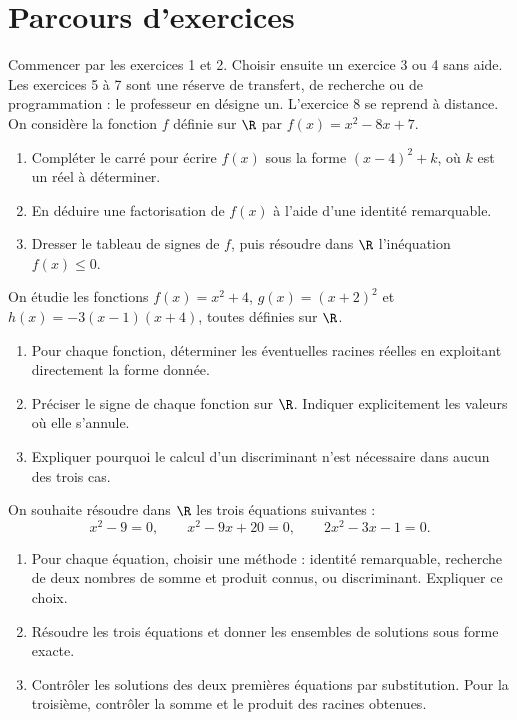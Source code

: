 \section*{Parcours d’exercices}\label{C02-PARC}
Commencer par les exercices 1 et 2. Choisir ensuite un exercice 3 ou 4 sans aide. Les exercices 5 à 7 sont une réserve de transfert, de recherche ou de programmation : le professeur en désigne un. L’exercice 8 se reprend à distance.
\begingroup
{}
On considère la fonction $f$ définie sur $\R$ par $f(x)=x^2-8x+7$.
\begin{enumerate}[label=\arabic*.]
\item Compléter le carré pour écrire $f(x)$ sous la forme $(x-4)^2+k$, où $k$ est un réel à déterminer.
\item En déduire une factorisation de $f(x)$ à l’aide d’une identité remarquable.
\item Dresser le tableau de signes de $f$, puis résoudre dans $\R$ l’inéquation $f(x)\leq0$.
\end{enumerate}
On étudie les fonctions $f(x)=x^2+4$, $g(x)=(x+2)^2$ et $h(x)=-3(x-1)(x+4)$, toutes définies sur $\R$.
\begin{enumerate}[label=\arabic*.]
\item Pour chaque fonction, déterminer les éventuelles racines réelles en exploitant directement la forme donnée.
\item Préciser le signe de chaque fonction sur $\R$. Indiquer explicitement les valeurs où elle s’annule.
\item Expliquer pourquoi le calcul d’un discriminant n’est nécessaire dans aucun des trois cas.
\end{enumerate}
On souhaite résoudre dans $\R$ les trois équations suivantes :\[x^2-9=0,\qquad x^2-9x+20=0,\qquad 2x^2-3x-1=0.\]
\begin{enumerate}[label=\arabic*.]
\item Pour chaque équation, choisir une méthode : identité remarquable, recherche de deux nombres de somme et produit connus, ou discriminant. Expliquer ce choix.
\item Résoudre les trois équations et donner les ensembles de solutions sous forme exacte.
\item Contrôler les solutions des deux premières équations par substitution. Pour la troisième, contrôler la somme et le produit des racines obtenues.
\end{enumerate}
